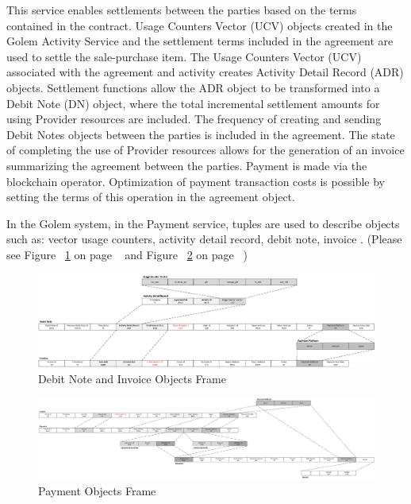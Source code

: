 This service enables settlements between the parties based on the terms contained in the contract. 
Usage Counters Vector (UCV) objects created in the Golem Activity Service and the settlement terms included in the agreement 
are used to settle the sale-purchase item. The Usage Counters Vector (UCV) associated with the agreement and activity creates 
Activity Detail Record (ADR) objects. Settlement functions allow the ADR object to be transformed into a Debit Note (DN) object, 
where the total incremental settlement amounts for using Provider resources are included. The frequency of creating and sending 
Debit Notes objects between the parties is included in the agreement. The state of completing the use of Provider resources allows 
for the generation of an invoice summarizing the agreement between the parties. 
Payment is made via the blockchain operator. Optimization of payment transaction costs is possible by setting the terms of this operation 
in the agreement object.

In the Golem system, in the Payment service, tuples are used to describe objects such as:
vector usage counters, activity detail record, debit note, invoice . 
(Please see Figure ~\ref{fig:PF1} on page ~\pageref{fig:PF1} and Figure ~\ref{fig:PF2} on page ~\pageref{fig:PF2})

\begin{figure}[H]
    \centering
    \includegraphics[width=17cm,angle=0]{./diag/Reference/PaymentFrame-1-Reference.png}
	\caption{Debit Note and Invoice Objects Frame}
    \label{fig:PF1}
\end{figure}

\begin{figure}[H]
    \centering
    \includegraphics[width=19cm,angle=0]{./diag/Reference/PaymentFrame-2-Reference.png}
	\caption{Payment Objects Frame}
    \label{fig:PF2}
\end{figure}

